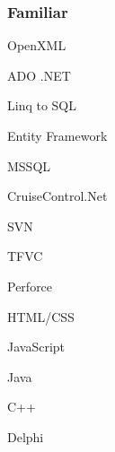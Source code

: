 \documentclass[a4paper,11pt]{article}
\begin{document}
\begin{minipage}[t]{0.34\textwidth}
    \subsubsection*{Familiar}
    \begin{inparaitem}
      \item OpenXML
      \item ADO .NET 
      \item Linq to SQL
      \item Entity Framework
      \item MSSQL
      \item CruiseControl.Net
      \item SVN
      \item TFVC
      \item Perforce
      \item HTML/CSS
      \item JavaScript
      \item Java
      \item C++
      \item Delphi
    \end{inparaitem}
  \end{minipage}
  \hfill
\end{document}
